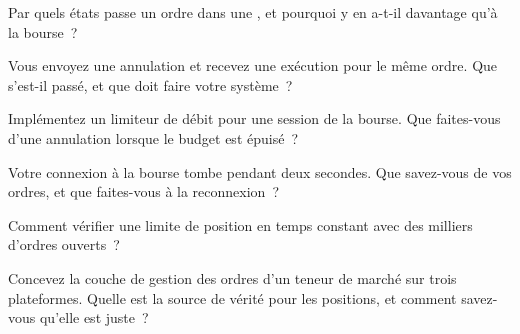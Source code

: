 \begin{interviewq}\label{iq:ll:order-gateway-and-order-management:1}
Par quels états passe un ordre dans une , et pourquoi y en a-t-il davantage qu'à la bourse~?
\end{interviewq}

\begin{interviewq}\label{iq:ll:order-gateway-and-order-management:2}
Vous envoyez une annulation et recevez une exécution pour le même ordre. Que s'est-il passé, et que doit faire votre système~?
\end{interviewq}

\begin{interviewq}\label{iq:ll:order-gateway-and-order-management:3}
Implémentez un limiteur de débit pour une session de la bourse. Que faites-vous d'une annulation lorsque le budget est épuisé~?
\end{interviewq}

\begin{interviewq}\label{iq:ll:order-gateway-and-order-management:4}
Votre connexion à la bourse tombe pendant deux secondes. Que savez-vous de vos ordres, et que faites-vous
à la reconnexion~?
\end{interviewq}

\begin{interviewq}\label{iq:ll:order-gateway-and-order-management:5}
Comment vérifier une limite de position en temps constant avec des milliers d'ordres ouverts~?
\end{interviewq}

\begin{interviewq}\label{iq:ll:order-gateway-and-order-management:6}
Concevez la couche de gestion des ordres d'un teneur de marché sur trois plateformes. Quelle est la source de vérité pour les positions, et comment
savez-vous qu'elle est juste~?
\end{interviewq}
